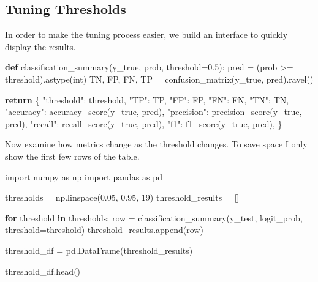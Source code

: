 \documentclass[
  letterpaper,
  DIV=11,
  numbers=noendperiod]{scrreprt}
\newenvironment{Shaded}{\begin{snugshade}}{\end{snugshade}}
\newcommand{\BuiltInTok}[1]{\textcolor[rgb]{0.00,0.23,0.31}{#1}}
\newcommand{\ControlFlowTok}[1]{\textcolor[rgb]{0.00,0.23,0.31}{\textbf{#1}}}
\newcommand{\DecValTok}[1]{\textcolor[rgb]{0.68,0.00,0.00}{#1}}
\newcommand{\FloatTok}[1]{\textcolor[rgb]{0.68,0.00,0.00}{#1}}
\newcommand{\ImportTok}[1]{\textcolor[rgb]{0.00,0.46,0.62}{#1}}
\newcommand{\KeywordTok}[1]{\textcolor[rgb]{0.00,0.23,0.31}{\textbf{#1}}}
\newcommand{\NormalTok}[1]{\textcolor[rgb]{0.00,0.23,0.31}{#1}}
\newcommand{\OperatorTok}[1]{\textcolor[rgb]{0.37,0.37,0.37}{#1}}
\newcommand{\StringTok}[1]{\textcolor[rgb]{0.13,0.47,0.30}{#1}}
\theoremstyle{definition}
\theoremstyle{definition}
\theoremstyle{plain}
\theoremstyle{plain}
\theoremstyle{remark}
\begin{document}
\subsection{Tuning Thresholds}\label{tuning-thresholds}

In order to make the tuning process easier, we build an interface to
quickly display the results.

\begin{Shaded}
\begin{Highlighting}[]
\KeywordTok{def}\NormalTok{ classification\_summary(y\_true, prob, threshold}\OperatorTok{=}\FloatTok{0.5}\NormalTok{):}
\NormalTok{    pred }\OperatorTok{=}\NormalTok{ (prob }\OperatorTok{\textgreater{}=}\NormalTok{ threshold).astype(}\BuiltInTok{int}\NormalTok{)}
\NormalTok{    TN, FP, FN, TP }\OperatorTok{=}\NormalTok{ confusion\_matrix(y\_true, pred).ravel()}

    \ControlFlowTok{return}\NormalTok{ \{}
        \StringTok{"threshold"}\NormalTok{: threshold,}
        \StringTok{"TP"}\NormalTok{: TP,}
        \StringTok{"FP"}\NormalTok{: FP,}
        \StringTok{"FN"}\NormalTok{: FN,}
        \StringTok{"TN"}\NormalTok{: TN,}
        \StringTok{"accuracy"}\NormalTok{: accuracy\_score(y\_true, pred),}
        \StringTok{"precision"}\NormalTok{: precision\_score(y\_true, pred),}
        \StringTok{"recall"}\NormalTok{: recall\_score(y\_true, pred),}
        \StringTok{"f1"}\NormalTok{: f1\_score(y\_true, pred),}
\NormalTok{    \}}
\end{Highlighting}
\end{Shaded}

Now examine how metrics change as the threshold changes. To save space I
only show the first few rows of the table.

\begin{Shaded}
\begin{Highlighting}[]
\ImportTok{import}\NormalTok{ numpy }\ImportTok{as}\NormalTok{ np}
\ImportTok{import}\NormalTok{ pandas }\ImportTok{as}\NormalTok{ pd}

\NormalTok{thresholds }\OperatorTok{=}\NormalTok{ np.linspace(}\FloatTok{0.05}\NormalTok{, }\FloatTok{0.95}\NormalTok{, }\DecValTok{19}\NormalTok{)}
\NormalTok{threshold\_results }\OperatorTok{=}\NormalTok{ []}

\ControlFlowTok{for}\NormalTok{ threshold }\KeywordTok{in}\NormalTok{ thresholds:}
\NormalTok{    row }\OperatorTok{=}\NormalTok{ classification\_summary(y\_test, logit\_prob, threshold}\OperatorTok{=}\NormalTok{threshold)}
\NormalTok{    threshold\_results.append(row)}

\NormalTok{threshold\_df }\OperatorTok{=}\NormalTok{ pd.DataFrame(threshold\_results)}

\NormalTok{threshold\_df.head()}
\end{Highlighting}
\end{Shaded}
\end{document}
